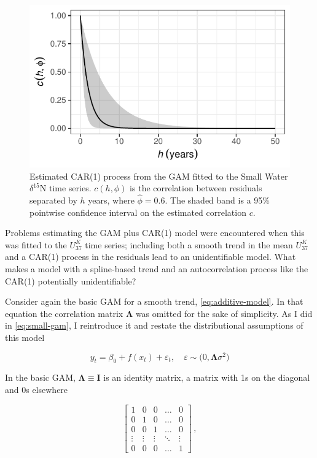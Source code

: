 \documentclass[12pt,]{article}
\newcommand{\uk}{\ensuremath{\mathit{U}^{\mathit{K}}_{\mathup{37}}}}
\begin{document}
\begin{figure}

{\centering \includegraphics[width=0.5\linewidth]{manuscript_files/figure-latex/car1-plot-1} 

}

\caption{Estimated CAR(1) process from the GAM fitted to the Small Water $\delta^{15}\text{N}$ time series. $c(h, \phi)$ is the correlation between residuals separated by $h$ years, where $\hat{\phi} = \text{0.6}$. The shaded band is a 95\% pointwise confidence interval on the estimated correlation $c$.}\label{fig:car1-plot}
\end{figure}

Problems estimating the GAM plus CAR(1) model were encountered when this
was fitted to the \uk{} time series; including both a smooth trend in
the mean \uk{} and a CAR(1) process in the residuals lead to an
unidentifiable model. What makes a model with a spline-based trend and
an autocorrelation process like the CAR(1) potentially unidentifiable?

Consider again the basic GAM for a smooth trend,
\eqref{eq:additive-model}. In that equation the correlation matrix
\(\boldsymbol{\Lambda}\) was omitted for the sake of simplicity. As I
did in \eqref{eq:small-gam}, I reintroduce it and restate the
distributional assumptions of this model

\begin{equation}
y_t = \beta_0 + f(x_t) + \varepsilon_t, \quad \varepsilon \sim \mathcal(0, \boldsymbol{\Lambda}\sigma^2)
\end{equation}

In the basic GAM, \(\boldsymbol{\Lambda} \equiv \mathbf{I}\) is an
identity matrix, a matrix with 1s on the diagonal and 0s elsewhere

\begin{equation*}
\begin{bmatrix}
1      & 0 & 0 & \dots & 0 \\
0      & 1 & 0 & \dots & 0 \\
0      & 0 & 1 & \dots & 0 \\
\vdots & \vdots & \vdots & \ddots & \vdots \\
0      & 0 & 0 & \dots & 1
\end{bmatrix}\, ,
\end{equation*}
\end{document}
